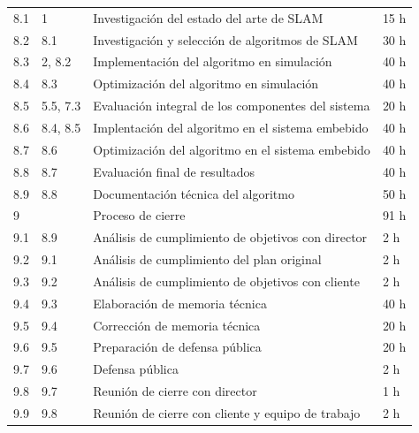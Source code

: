 \documentclass[
11pt, %
codirector, %
]{charter}
\begin{document}
\begin{table}[htpb]
\begin{tabular}{@{}llll@{}}
8.1             & 1                    & Investigación del estado del arte de SLAM          & 15 h               \\
8.2             & 8.1                  & Investigación y selección de algoritmos de SLAM    & 30 h               \\
8.3             & 2, 8.2               & Implementación del algoritmo en simulación         & 40 h               \\
8.4             & 8.3                  & Optimización del algoritmo en simulación           & 40 h               \\
8.5             & 5.5, 7.3             & Evaluación integral de los componentes del sistema & 20 h               \\
8.6             & 8.4, 8.5             & Implentación del algoritmo en el sistema embebido  & 40 h               \\
8.7             & 8.6                  & Optimización del algoritmo en el sistema embebido  & 40 h               \\
8.8             & 8.7                  & Evaluación final de resultados                     & 40 h               \\
8.9             & 8.8                  & Documentación técnica del algoritmo                & 50 h               \\
9               &                      & Proceso de cierre                                  & 91 h               \\ 
9.1             & 8.9                  & Análisis de cumplimiento de objetivos con director & 2 h                \\ 
9.2             & 9.1                  & Análisis de cumplimiento del plan original         & 2 h                \\ 
9.3             & 9.2                  & Análisis de cumplimiento de objetivos con cliente  & 2 h                \\ 
9.4             & 9.3                  & Elaboración de memoria técnica                     & 40 h               \\ 
9.5             & 9.4                  & Corrección de memoria técnica                      & 20 h               \\
9.6             & 9.5                  & Preparación de defensa pública                     & 20 h               \\
9.7             & 9.6                  & Defensa pública                                    & 2 h                \\
9.8             & 9.7                  & Reunión de cierre con director                     & 1 h                \\
9.9             & 9.8                  & Reunión de cierre con cliente y equipo de trabajo  & 2 h                \\ \bottomrule
\end{tabular}
\end{table}
\end{document}
